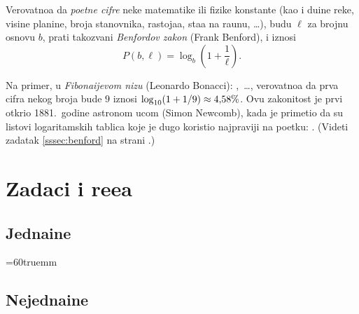 \documentclass[12pt, twoside, a4paper]{article}
\def\idx#1{#1\index{#1}}
\def\logten{\log_{10}}
\def\.{\smash{,}\vphantom{.}}
\begin{document}
Verovatno{\cc}a da {\sl po{\cv}etne cifre\/} neke matemati{\cv}ke ili fizi{\cv}ke konstante
(kao i du{\zv}ine reke, visine planine, broja stanovnika, rastoja{\nj}a,
sta{\nj}a na ra{\cv}unu, \dots), 
budu $\ell$ za brojnu osnovu $b$, prati takozvani {\sl \idx{Benfordov zakon}\/} (Frank Benford), i iznosi
\begin{equation}\label{eq:benford}
  P(b,\ell)=\log_b \left(1+\frac1\ell\right).
\end{equation}

Na primer, u {\sl Fibona{\cv}ijevom  nizu\/} (Leonardo Bonacci): ,~\dots,
verovatno{\cc}a da prva cifra nekog broja bude $9$ iznosi $\logten(1+1/9)\approx4\.58\%$.
Ovu zakonitost je prvi otkrio 1881.\ godine astronom {\Nj}ucom (Simon Newcomb), kada je primetio da su
listovi logaritamskih tablica koje je dugo koristio najpr{\lj}aviji
na po{\cv}etku: .
(Videti zadatak \ref{sssec:benford} na strani \pageref{sssec:benford}.)

% 

\section{Zadaci i re{\sv}e{\nj}a}\label{sec:zadaci}

\subsection{Jedna{\cv}ine}

\newdimen\sirina \sirina=60truemm

\def\jed{Jedna{\cv}ina~}










\newpage

\subsection{Nejedna{\cv}ine}






% 

% 


\newpage

\end{document}

